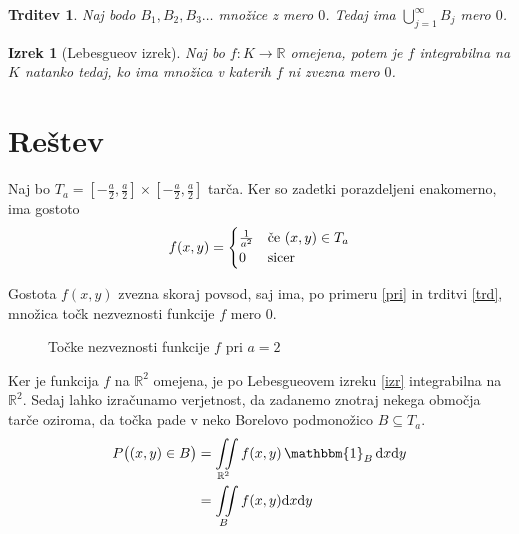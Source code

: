 \documentclass{amsart}
\newcommand{\R}{\mathbb{R}}
\theoremstyle{definition} %
\theoremstyle{plain} %
\newtheorem{izrek}[definicija]{Izrek}
\newtheorem{trditev}[definicija]{Trditev}
\newtheorem{posledica}[definicija]{Posledica}
\begin{document}
\begin{trditev}\label{trd}
    Naj bodo $B_1, B_2, B_3 \ldots $ množice z mero $0$. Tedaj ima $\bigcup_{j=1}^{\infty} B_{j}$ mero $0$.
\end{trditev}


\begin{izrek}[Lebesgueov izrek]\label{izr}
    Naj bo $f \colon K \to \R $ omejena, potem je $f$ integrabilna na $K$ natanko tedaj, ko ima množica
    v katerih $f$ ni zvezna mero $0$.
\end{izrek}

\pagebreak

\section{Reštev}

Naj bo $T_a = \left[ -\frac{a}{2} , \frac{a}{2}\right]\times\left[-\frac{a}{2},\frac{a}{2}\right]$
tarča. Ker so zadetki porazdeljeni enakomerno, ima gostoto
\begin{equation*}
    f(x,y) = 
    \begin{cases}
        \frac{1}{a^2} & \text{če $ (x,y) \in T_a  $} \\
        0 & \text{sicer}
    \end{cases}
\end{equation*}

Gostota $f(x,y)$ zvezna skoraj povsod, saj ima, po primeru \eqref{pri} in trditvi 
\eqref{trd}, množica točk nezveznosti funkcije $f$ mero $0$.
\begin{figure}[!ht]
    \centering
    \caption{Točke nezveznosti funkcije $f$ pri $a=2$}
\end{figure}

Ker je funkcija $f$ na $\R^2$ omejena, je po Lebesgueovem izreku \eqref{izr} integrabilna na $\R^2$.
Sedaj lahko izračunamo verjetnost, da zadanemo znotraj nekega območja tarče oziroma, da točka
pade v neko Borelovo podmonožico $B \subseteq T_a$.
\begin{align*}
    P\big((x,y) \in B\big)
    &= \iint\limits_{\R^2} f(x,y) \, \mathbbm{1}_{B} \, \mathrm{d}x\mathrm{d}y \\
    &= \iint\limits_{B} f(x,y) \mathrm{d}x\mathrm{d}y
\end{align*}
\end{document}

